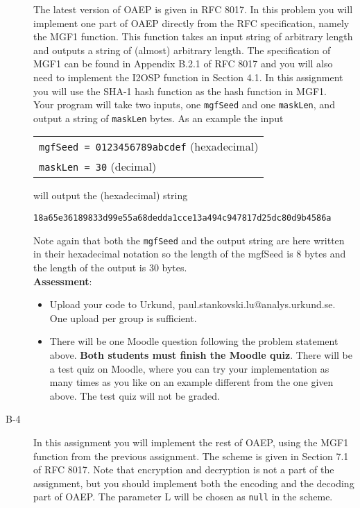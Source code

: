 \documentclass{article}
\begin{document}
\begin{description}
{    The latest version of OAEP is given in RFC 8017. In this problem you will implement one part of OAEP directly from the RFC specification, namely the MGF1 function. This function takes an input string of arbitrary length and outputs a string of (almost) arbitrary length. The specification of MGF1 can be found in Appendix B.2.1 of RFC 8017 and you will also need to implement the I2OSP function in Section 4.1. In this assignment you will use the SHA-1 hash function as the hash function in MGF1.\\
    Your program will take two inputs, one \texttt{mgfSeed} and one \texttt{maskLen}, and output a string of \texttt{maskLen} bytes.
    As an example the input
    \begin{center}
    \begin{tabular}{l}
	\texttt{mgfSeed = 0123456789abcdef} (hexadecimal)\\
    \texttt{maskLen = 30} (decimal)\\
    \end{tabular}
    \end{center}
    will output the (hexadecimal) string
    \begin{center}
    \texttt{18a65e36189833d99e55a68dedda1cce13a494c947817d25dc80d9b4586a}\\
    \end{center}
    Note again that both the \texttt{mgfSeed} and the output string are here written in their hexadecimal notation so the length of the mgfSeed is 8 bytes and the length of the output is 30 bytes.\\
    \textbf{Assessment}:
	\begin{itemize}
		\item Upload your code to Urkund, paul.stankovski.lu@analys.urkund.se.
        One upload per group is sufficient.
        
		\item There will be one Moodle question following the problem statement above. 
        \textbf{Both students must finish the Moodle quiz}.
        There will be a test quiz on Moodle, where you can try your implementation as many times as you like on an example different from the one given above. The test quiz will not be graded.
	\end{itemize}
}
	\item[B-4]{In this assignment you will implement the rest of OAEP, using the MGF1 function from the previous assignment. The scheme is given in Section 7.1 of RFC 8017. Note that encryption and decryption is not a part of the assignment, but you should implement both the encoding and the decoding part of OAEP. The parameter L will be chosen as \texttt{null} in the scheme.
    
}
\end{description}
\end{document}
